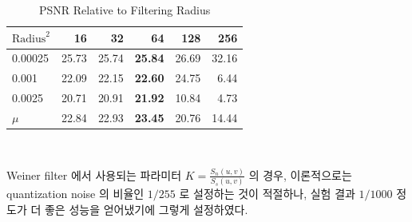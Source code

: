 \documentclass[a4paper, 12p]{paper}
\begin{document}
\begin{table}[ht]
  \centering
\begin{threeparttable}
  \caption{PSNR Relative to Filtering Radius}\label{table:radius}
\begin{tabular}{l | r r r r r }
 $\text{Radius}^2$ & 16    & 32    & \textbf{64}   & 128   & 256   \\ \hline
  \toprule
0.00025            & 25.73 & 25.74 & \textbf{25.84} & 26.69 & 32.16 \\ \hline
0.001              & 22.09 & 22.15 & \textbf{22.60} & 24.75 & 6.44  \\ \hline
0.0025             & 20.71 & 20.91 & \textbf{21.92} & 10.84 & 4.73  \\ \hline
\bottomrule
$\mu$              & 22.84 & 22.93 & \textbf{23.45} & 20.76 & 14.44 \\ \hline
\end{tabular}
\end{threeparttable}\\
\end{table}

Weiner filter 에서 사용되는 파라미터 $K = \frac{S_n(u, v)}{S_s(u, v)}$ 의 경우, 이론적으로는 quantization noise 의 비율인 $1 / 255$ 로 설정하는 것이 적절하나, 실험 결과 $1/1000$ 정도가 더 좋은 성능을 얻어냈기에 그렇게 설정하였다.
\end{document}
